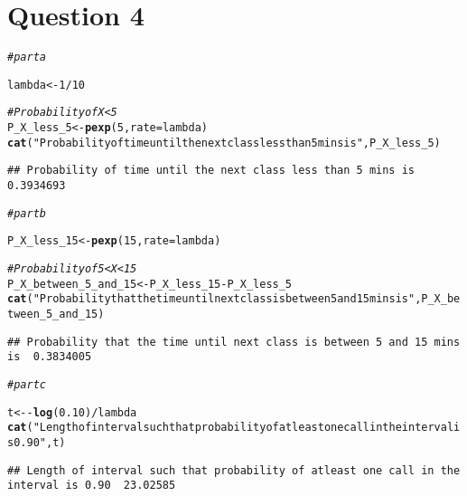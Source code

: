 \documentclass{article}\usepackage[]{graphicx}\usepackage[]{xcolor}
\makeatletter
\newcommand{\hlnum}[1]{\textcolor[rgb]{0.686,0.059,0.569}{#1}}%
\newcommand{\hlsng}[1]{\textcolor[rgb]{0.192,0.494,0.8}{#1}}%
\newcommand{\hlcom}[1]{\textcolor[rgb]{0.678,0.584,0.686}{\textit{#1}}}%
\newcommand{\hlopt}[1]{\textcolor[rgb]{0,0,0}{#1}}%
\newcommand{\hldef}[1]{\textcolor[rgb]{0.345,0.345,0.345}{#1}}%
\newcommand{\hlkwb}[1]{\textcolor[rgb]{0.69,0.353,0.396}{#1}}%
\newcommand{\hlkwc}[1]{\textcolor[rgb]{0.333,0.667,0.333}{#1}}%
\newcommand{\hlkwd}[1]{\textcolor[rgb]{0.737,0.353,0.396}{\textbf{#1}}}%
\newenvironment{kframe}{%
 \def\at@end@of@kframe{}%
 \ifinner\ifhmode%
  \def\at@end@of@kframe{\end{minipage}}%
  \begin{minipage}{\columnwidth}%
 \fi\fi%
 \def\FrameCommand##1{\hskip\@totalleftmargin \hskip-\fboxsep
 \colorbox{shadecolor}{##1}\hskip-\fboxsep
     \hskip-\linewidth \hskip-\@totalleftmargin \hskip\columnwidth}%
 \MakeFramed {\advance\hsize-\width
   \@totalleftmargin\z@ \linewidth\hsize
   \@setminipage}}%
 {\par\unskip\endMakeFramed%
 \at@end@of@kframe}
\newenvironment{knitrout}{}{} %
\makeatother
\begin{document}
\section{Question 4}
\begin{knitrout}
\color{fgcolor}\begin{kframe}
\begin{alltt}
\hlcom{# part a}

\hldef{lambda} \hlkwb{<-} \hlnum{1} \hlopt{/} \hlnum{10}

\hlcom{# Probability of X < 5}
\hldef{P_X_less_5} \hlkwb{<-} \hlkwd{pexp}\hldef{(}\hlnum{5}\hldef{,} \hlkwc{rate} \hldef{= lambda)}
\hlkwd{cat}\hldef{(}\hlsng{"Probability of time until the next class less than 5 mins is "}\hldef{,P_X_less_5)}
\end{alltt}
\begin{verbatim}
## Probability of time until the next class less than 5 mins is  0.3934693
\end{verbatim}
\begin{alltt}
\hlcom{# part b}

\hldef{P_X_less_15} \hlkwb{<-} \hlkwd{pexp}\hldef{(}\hlnum{15}\hldef{,} \hlkwc{rate} \hldef{= lambda)}

\hlcom{# Probability of 5 < X < 15}
\hldef{P_X_between_5_and_15} \hlkwb{<-} \hldef{P_X_less_15} \hlopt{-} \hldef{P_X_less_5}
\hlkwd{cat}\hldef{(}\hlsng{"Probability that the time until next class is between 5 and 15 mins is "}\hldef{,P_X_between_5_and_15)}
\end{alltt}
\begin{verbatim}
## Probability that the time until next class is between 5 and 15 mins is  0.3834005
\end{verbatim}
\begin{alltt}
\hlcom{# part c}

\hldef{t} \hlkwb{<-} \hlopt{-}\hlkwd{log}\hldef{(}\hlnum{0.10}\hldef{)} \hlopt{/} \hldef{lambda}
\hlkwd{cat}\hldef{(}\hlsng{"Length of interval such that probability of atleast one call in the interval is 0.90 "}\hldef{,t)}
\end{alltt}
\begin{verbatim}
## Length of interval such that probability of atleast one call in the interval is 0.90  23.02585
\end{verbatim}
\end{kframe}
\end{knitrout}
\end{document}
